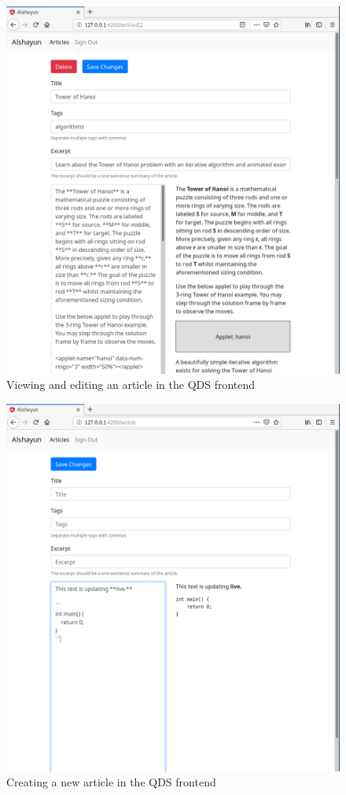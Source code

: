 \documentclass[12pt]{report}
\begin{document}
\begin{figure}
    \centering
    \includegraphics[scale=0.4]{images/qds-article-hanoi.png}
    \caption{Viewing and editing an article in the QDS frontend}
    \label{fig:qds-article}
\end{figure}

\begin{figure}
    \centering
    \includegraphics[scale=0.4]{images/qds-create-new.png}
    \caption{Creating a new article in the QDS frontend}
    \label{fig:qds-create-new}
\end{figure}
\end{document}
